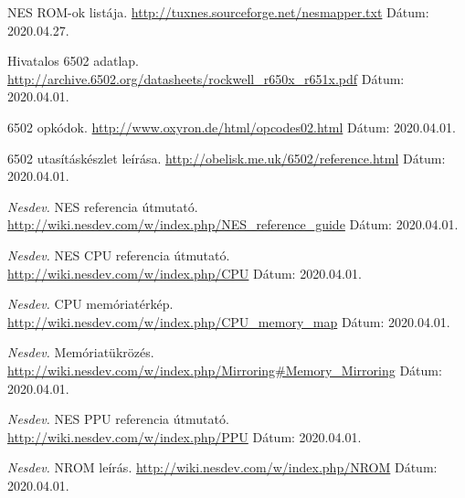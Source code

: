 \documentclass[
]{elteikthesis}[2020/02/26]
\begin{document}
\begin{thebibliography}{9}
	NES ROM-ok listája.
	\newline
	\url{http://tuxnes.sourceforge.net/nesmapper.txt}
	\newline Dátum: 2020.04.27.
	
	Hivatalos 6502 adatlap.
	\newline
	\url{http://archive.6502.org/datasheets/rockwell_r650x_r651x.pdf}
	\newline Dátum: 2020.04.01.
	
	6502 opkódok.
	\newline
	\url{http://www.oxyron.de/html/opcodes02.html}
	\newline Dátum: 2020.04.01.
	
	6502 utasításkészlet leírása.
	\newline
	\url{http://obelisk.me.uk/6502/reference.html}
	\newline Dátum: 2020.04.01.
	
	\textit{Nesdev.}
	NES referencia útmutató.
	\newline
	\url{http://wiki.nesdev.com/w/index.php/NES_reference_guide}
	\newline Dátum: 2020.04.01.
	
	\textit{Nesdev.}
	NES CPU referencia útmutató.
	\newline
	\url{http://wiki.nesdev.com/w/index.php/CPU}
	\newline Dátum: 2020.04.01.
	
	\textit{Nesdev.}
     CPU memóriatérkép.
	\newline
	\url{http://wiki.nesdev.com/w/index.php/CPU_memory_map}
	\newline Dátum: 2020.04.01.
	
	\textit{Nesdev.}
	Memóriatükrözés.
	\newline
	\url{http://wiki.nesdev.com/w/index.php/Mirroring#Memory_Mirroring}
	\newline Dátum: 2020.04.01.
	
	\textit{Nesdev.}
	NES PPU referencia útmutató.
	\newline
	\url{http://wiki.nesdev.com/w/index.php/PPU}
	\newline Dátum: 2020.04.01.
	
	\textit{Nesdev.}
	NROM leírás.
	\newline
	\url{http://wiki.nesdev.com/w/index.php/NROM}
	\newline Dátum: 2020.04.01.
	

\end{thebibliography}
\end{document}
